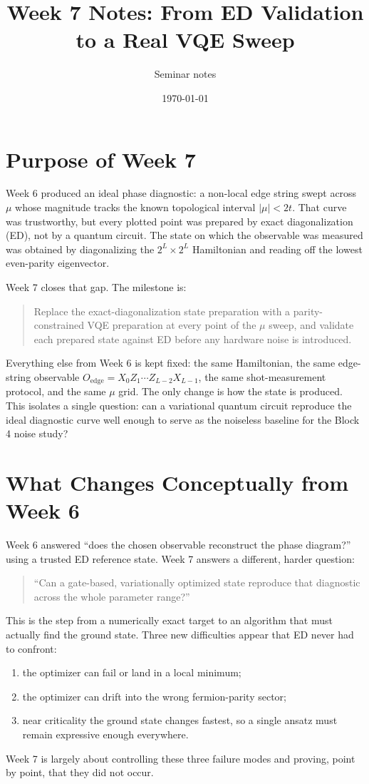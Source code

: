 \documentclass[11pt]{article}
\title{Week 7 Notes: From ED Validation to a Real VQE Sweep}
\author{Seminar notes}
\date{\today}
\newcommand{\Oedge}{X_0 Z_1\cdots Z_{L-2} X_{L-1}}
\begin{document}
\maketitle

\section{Purpose of Week 7}

Week 6 produced an ideal phase diagnostic: a non-local edge string swept across $\mu$ whose magnitude tracks the known topological interval $|\mu|<2t$. That curve was trustworthy, but every plotted point was prepared by exact diagonalization (ED), not by a quantum circuit. The state on which the observable was measured was obtained by diagonalizing the $2^L\times 2^L$ Hamiltonian and reading off the lowest even-parity eigenvector.

Week 7 closes that gap. The milestone is:
\begin{quote}
  Replace the exact-diagonalization state preparation with a parity-constrained VQE preparation at every point of the $\mu$ sweep, and validate each prepared state against ED before any hardware noise is introduced.
\end{quote}

Everything else from Week 6 is kept fixed: the same Hamiltonian, the same edge-string observable $O_{\mathrm{edge}}=\Oedge$, the same shot-measurement protocol, and the same $\mu$ grid. The only change is how the state is produced. This isolates a single question: can a variational quantum circuit reproduce the ideal diagnostic curve well enough to serve as the noiseless baseline for the Block 4 noise study?

\section{What Changes Conceptually from Week 6}

Week 6 answered ``does the chosen observable reconstruct the phase diagram?'' using a trusted ED reference state. Week 7 answers a different, harder question:
\begin{quote}
  ``Can a gate-based, variationally optimized state reproduce that diagnostic across the whole parameter range?''
\end{quote}

This is the step from a numerically exact target to an algorithm that must actually find the ground state. Three new difficulties appear that ED never had to confront:
\begin{enumerate}
  \item the optimizer can fail or land in a local minimum;
  \item the optimizer can drift into the wrong fermion-parity sector;
  \item near criticality the ground state changes fastest, so a single ansatz must remain expressive enough everywhere.
\end{enumerate}
Week 7 is largely about controlling these three failure modes and proving, point by point, that they did not occur.
\end{document}
